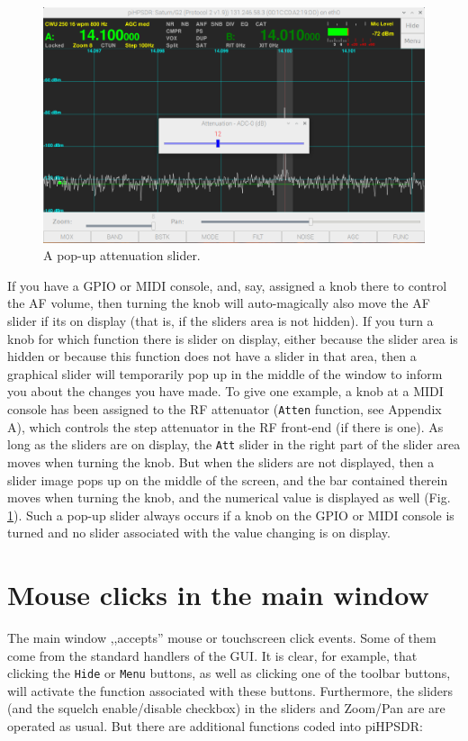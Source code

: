 \documentclass[12pt]{book}
\def\rett#1{\texttt{\color{red}#1}}
\def\bltt#1{\texttt{\color{blue}#1}}
\begin{document}
\begin{figure}
\center
\includegraphics[width=12cm]{SliderOnScreen.png}
\caption{A pop-up attenuation slider.}
\label{fig:SliderOnScreen}
\end{figure}

If you have a GPIO or  MIDI  console, and, say, assigned
a knob there to control the AF volume, then turning the
knob will auto-magically also move the AF slider if its
on display (that is, if the sliders area is not hidden).
If you turn a knob for which function there is slider
on display, either because the slider area is hidden or
because this function does not have a slider in that area,
then a graphical slider will temporarily pop up in the
middle of the window to inform you about the changes 
you have  made. To give one example, a knob at a
MIDI console has been assigned to the RF attenuator (\bltt{Atten}
function, see Appendix A), which controls the step 
attenuator in the RF front-end (if there is one). As long
as the  sliders  are  on display, the \rett{Att} slider
in the right part of the slider area moves when turning
the knob. But when the sliders are not displayed, then a slider image
pops up  on the middle of the screen, and the
bar contained therein moves when turning the knob,
and the numerical value is displayed as well (Fig. \ref{fig:SliderOnScreen}).
Such a pop-up slider always occurs if a knob on the GPIO or MIDI
console is turned and no slider associated with the value changing is
on display.


\section{Mouse clicks in the main window}
The main window ,,accepts'' mouse or touchscreen click events.
Some of them come from the standard handlers of the GUI. It is
clear, for example, that clicking the \rett{Hide} or
\rett{Menu} buttons, as well as clicking one of the
toolbar buttons, will activate the function associated with
these buttons. Furthermore, the sliders (and the squelch enable/disable
checkbox) in the sliders and Zoom/Pan are are operated as usual.
But there are additional functions coded into piHPSDR:
\end{document}
